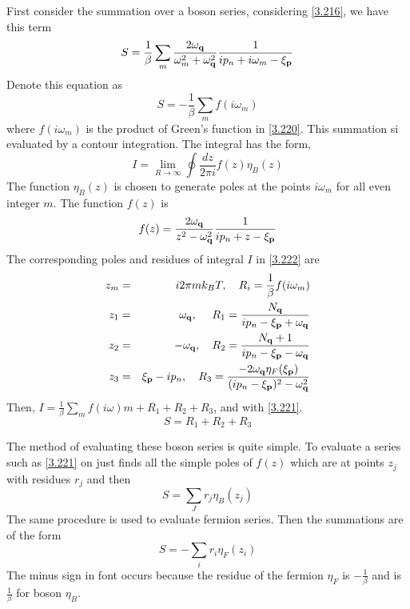 First consider the summation over a boson series, considering \eqref{3.216}, we have this term
\begin{equation}
  S = \frac{1}{\beta} \sum_m \frac{2\omega_{\mathbf{q}}}{\omega_m^2+\omega_{\mathbf{q}}^2} \frac{1}{ip_n+i\omega_m -\xi_{\mathbf{p}}} \label{3.220}
\end{equation}
Denote this equation as
\begin{equation}
  S = -\frac{1}{\beta} \sum_m f(i\omega_m) \label{3.221}
\end{equation}
where $f(i\omega_m)$ is the product of Green's function in \eqref{3.220}. This summation si evaluated by a contour integration. The integral has the form,
\begin{equation}
  I = \lim_{R\to \infty} \oint \frac{dz}{2\pi i} f(z) \eta_B(z)  \label{3.222}
\end{equation}
The function $\eta_B(z)$ is chosen to generate poles at the points $i\omega_m$ for all even integer $m$.
The function $f(z)$ is
\begin{equation}
  f(z) = \frac{2\omega_{\mathbf{q}}}{z^2-\omega_{\mathbf{q}}^2} \frac{1}{ip_n + z - \xi_{\mathbf{p}}}  \label{3.224}
\end{equation}
The corresponding poles and residues of integral $I$ in \eqref{3.222} are
\begin{eqnarray}
  z_m &=& i 2\pi m k_B T,~ ~ ~ R_i = \frac{1}{\beta}f(i\omega_m)  \nonumber\\
  z_1 &=& \omega_{\mathbf{q}}, ~ ~ ~ ~ R_1 = \frac{N_{\mathbf{q}}}{ip_n- \xi_{\mathbf{p}}+ \omega_{\mathbf{q}}} \nonumber \\
  z_2 &=& -\omega_{\mathbf{q}}, ~ ~ ~ R_2 = \frac{N_{\mathbf{q}}+1}{ip_n -\xi_{\mathbf{p}}-\omega_{\mathbf{q}}} \nonumber \\
  z_3 &=& \xi_{\mathbf{p}} - ip_n, ~ ~ ~ R_3 = \frac{-2\omega_{\mathbf{q}} \eta_F(\xi_{\mathbf{p}})}{(ip_n-\xi_{\mathbf{p}})^2-\omega_{\mathbf{q}}^2} \label{3.225}
\end{eqnarray}
Then, $I = \frac{1}{\beta} \sum_m f(i\omega)m + R_1 + R_2 + R_3$, and with \eqref{3.221}.
\begin{equation}
  S = R_1 + R_2 + R_3 \label{3.228}
\end{equation}

The method of evaluating these boson series is quite simple.
To evaluate a series such as \eqref{3.221} on just finds all the simple poles of $f(z)$ which are at points $z_j$ with residues $r_j$ and then
\begin{equation}
  S = \sum_J r_j \eta_B(z_j)  \label{3.229}
\end{equation}
The same procedure is used to evaluate fermion series. Then the summations are of the form
\begin{equation}
  S = - \sum_i r_i \eta_F(z_i)  \label{3.231}
\end{equation}
The minus sign in font occurs because the residue of the fermion $\eta_F$ is $-\frac{1}{\beta}$ and is $\frac{1}{\beta}$ for boson $\eta_B$.
